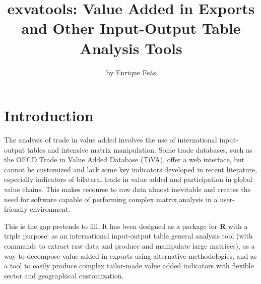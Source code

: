 \title{exvatools: Value Added in Exports and Other Input-Output Table Analysis Tools}


\author{by Enrique Feás}

\maketitle


\hypertarget{introduction}{%
\section{Introduction}\label{introduction}}

The analysis of trade in value added involves the use of international
input-output tables and intensive matrix manipulation. Some trade databases,
such as the OECD Trade in Value Added Database (TiVA), offer a web interface,
but cannot be customized and lack some key indicators developed in recent
literature, especially indicators of bilateral trade in value added and
participation in global value chains. This makes recourse to raw data almost
inevitable and creates the need for software capable of performing complex
matrix analysis in a user-friendly environment.

This is the gap  pretends to fill. It has been designed as a
package for \textbf{R} with a triple purpose: as an international input-output table
general analysis tool (with commands to extract raw data and produce and
manipulate large matrices), as a way to decompose value added in exports using
alternative methodologies, and as a tool to easily produce complex tailor-made
value added indicators with flexible sector and geographical customization.

